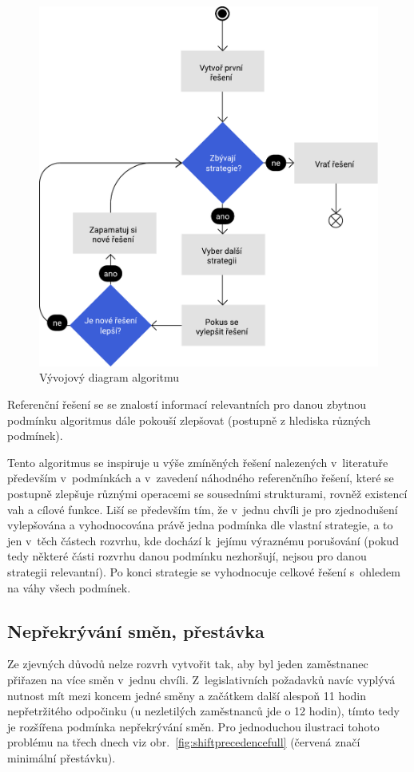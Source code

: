 \documentclass[twoside]{ctuthesis}
\begin{document}
\begin{figure}
	\includegraphics[scale=0.7]{img/algorithm-flow.pdf}
	\caption{Vývojový diagram algoritmu}
	\label{fig:algorithmflow}
\end{figure}

Referenční řešení se se znalostí informací relevantních pro danou zbytnou podmínku algoritmus dále pokouší zlepšovat (postupně z hlediska různých podmínek).

Tento algoritmus se inspiruje u výše zmíněných řešení nalezených v~literatuře především v~podmínkách a v~zavedení náhodného referenčního řešení, které se postupně zlepšuje různými operacemi se sousedními strukturami, rovněž existencí vah a cílové funkce. Liší se především tím, že v~jednu chvíli je pro zjednodušení vylepšována a vyhodnocována právě jedna podmínka dle vlastní strategie, a to jen v~těch částech rozvrhu, kde dochází k~jejímu výraznému porušování (pokud tedy některé části rozvrhu danou podmínku nezhoršují, nejsou pro danou strategii relevantní). Po konci strategie se vyhodnocuje celkové řešení s~ohledem na váhy všech podmínek.

\subsection{Nepřekrývání směn, přestávka}
Ze zjevných důvodů nelze rozvrh vytvořit tak, aby byl jeden zaměstnanec přiřazen na více směn v~jednu chvíli. Z~legislativních požadavků navíc vyplývá nutnost mít mezi koncem jedné směny a začátkem další alespoň 11 hodin nepřetržitého odpočinku (u nezletilých zaměstnanců jde o 12 hodin), tímto tedy je rozšířena podmínka nepřekrývání směn. Pro jednoduchou ilustraci tohoto problému na třech dnech viz obr.~\ref{fig:shiftprecedencefull} (červená značí minimální přestávku).
\end{document}
